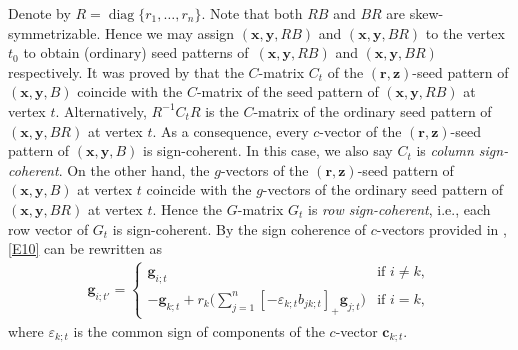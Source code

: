 Denote by $R=\operatorname{diag}\{r_1,\dots,r_n\}$. Note that both $RB$ and $BR$ are skew-symmetrizable. Hence we may assign $(\mathbf{x},\mathbf{y}, RB)$ and $(\mathbf{x},\mathbf{y},BR)$ to the vertex $t_0$ to obtain (ordinary) seed patterns of~$(\mathbf{x},\mathbf{y}, RB)$ and $(\mathbf{x},\mathbf{y},BR)$ respectively.
It was proved by \cite[Proposition 3.9]{Nakanishi14} that the $C$-matrix $C_t$ of the $(\mathbf{r},\mathbf{z})$-seed pattern of $(\mathbf{x},\mathbf{y}, B)$ coincide with the $C$-matrix of the seed pattern of $(\mathbf{x},\mathbf{y}, RB)$ at vertex $t$. Alternatively, $R^{-1}C_tR$ is the $C$-matrix of the ordinary seed pattern of $(\mathbf{x},\mathbf{y}, BR)$ at vertex $t$. As a consequence, every $c$-vector of the $(\mathbf{r},\mathbf{z})$-seed pattern of $(\mathbf{x},\mathbf{y}, B)$ is sign-coherent. In this case, we also say $C_t$ is {\it column sign-coherent}. On the other hand, the $g$-vectors of the $(\mathbf{r},\mathbf{z})$-seed pattern of $(\mathbf{x},\mathbf{y}, B)$ at vertex $t$ coincide with the $g$-vectors of the ordinary seed pattern of $(\mathbf{x},\mathbf{y},BR)$ at vertex $t$. Hence the $G$-matrix $G_t$ is {\it row sign-coherent}, i.e., each row vector of $G_t$ is sign-coherent.
By the sign coherence of $c$-vectors provided in \cite[Corollary 5.5]{GHKK2018}, \eqref{E10} can be rewritten as
\begin{align}\label{E15}
\mathbf{g}_{i;t'}=\begin{cases}\mathbf{g}_{i;t}& \text{if $i\neq k$},\\
 \displaystyle-\mathbf{g}_{k;t}+r_k\biggl(\sum\limits_{j=1}^{n}[-\varepsilon_{k;t} b_{jk;t}]_+\mathbf{g}_{j;t}\biggr)& \text{if $i=k$},
 \end{cases}
\end{align}
where $\varepsilon_{k;t}$ is the common sign of components of the $c$-vector $\mathbf{c}_{k;t}$.

